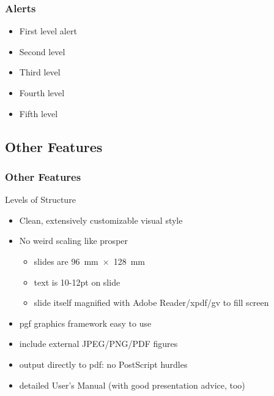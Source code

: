 \documentclass[11pt]{beamer}
\begin{document}
\begin{frame}
  \frametitle{Alerts}
  \begin{itemize}
     \item First level \alert{alert}
     \item Second level 
     \item Third level 
     \item Fourth level 
     \item Fifth level 
  \end{itemize}

\end{frame}
  

\subsection{Other Features}

\begin{frame}
  \frametitle{Other Features}

  \begin{block}{Levels of Structure}
    \begin{itemize}
      \item Clean, extensively customizable visual style
      
      \item No weird scaling like prosper
      \begin{itemize}
        \item slides are 96~mm~$\times$~128~mm
        
        \item text is 10-12pt on slide
        
        \item slide itself magnified with Adobe Reader/xpdf/gv to fill screen
      \end{itemize}
      
      \item pgf graphics framework easy to use
      
      \item include external JPEG/PNG/PDF figures
      
      \item output directly to pdf: no PostScript hurdles
      
      \item detailed User's Manual (with good presentation advice, too)
    \end{itemize}
  \end{block}
\end{frame}
\end{document}
